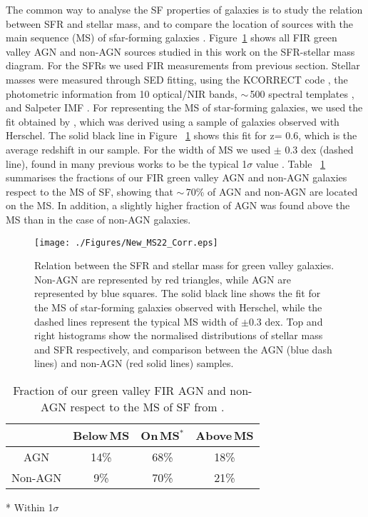\documentclass[fleqn,usenatbib]{mnras}
\begin{document}
The common way to analyse the SF properties of galaxies is to study the relation between SFR and stellar mass, and to compare the location of sources with the main sequence (MS) of sfar-forming galaxies \citep[e.g][]{Brinchmann, Elbaz, Gonzalez2010, Whitaker, Guo2013, Leslie2016, povic2016, Netzer2016}. Figure~\ref{MS_both} shows all FIR green valley AGN and non-AGN sources studied in this work on the SFR-stellar mass diagram. For the SFRs we used FIR measurements from previous section. Stellar masses were measured through SED fitting, using the KCORRECT code \citep{Blanton}, the photometric information from 10 optical/NIR bands, $\sim$\,500 spectral templates \citep{Blanton}, and Salpeter IMF \citep{Salpeter1955}. For representing the MS of star-forming galaxies, we used the fit obtained by \citet[][and their equation 13]{Elbaz2011}, which was derived using a sample of galaxies observed with Herschel. The solid black line in Figure ~\ref{MS_both} shows this fit for z= 0.6, which is the average redshift in our sample. For the width of MS we used $\pm$ 0.3 dex (dashed line), found in many previous works to be the typical 1$\sigma$ value \citep[e.g,][]{Elbaz, Whitaker,Whitaker2014, Shimizu}. Table ~\ref{Table1} summarises the fractions of our FIR green valley AGN and non-AGN galaxies respect to the MS of SF, showing that $\sim$\,70\% of AGN and non-AGN are located on the MS. In addition, a slightly higher fraction of AGN was found above the MS than in the case of non-AGN galaxies.     

\begin{figure}
\centering
\texttt{[image: ./Figures/New\_MS22\_Corr.eps]}
\caption{Relation between the SFR and stellar mass for green valley galaxies. Non-AGN are represented by red triangles, while AGN are represented by blue squares. The solid black line shows the \citet{Elbaz2011} fit for the MS of star-forming galaxies observed with Herschel, while the dashed lines represent the typical MS width of $\pm$0.3 dex. Top and right histograms show the normalised distributions of stellar mass and SFR respectively, and comparison between the AGN (blue dash lines) and non-AGN (red solid lines) samples. \label{MS_both}}
\end{figure}

\begin{table}
\caption{Fraction of our green valley FIR AGN and non-AGN respect to the MS of SF from \citet{Elbaz2011}.}
\label{Table1}
\begin{tabular}{cccc} \hline
           & Below\,MS  & On\,MS$^*$  & Above\,MS \\\hline
  AGN      & 14\%         & 68\%  &  18\%      \\
  Non-AGN  & 9\%         & 70\%  &  21\%       \\ \hline
\end{tabular}
\begin{flushleft}
{* Within 1$\sigma$}
\end{flushleft}
\end{table}
\end{document}
